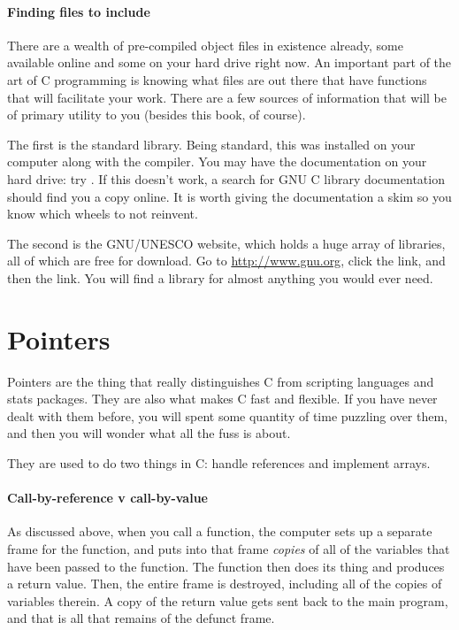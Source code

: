 \documentclass[12pt]{article}
\def\ind#1{\index{#1}#1}
\begin{document}
\paragraph{\treesymbol{} Finding files to include}    
There are a wealth of pre-compiled object files in existence already,
some available online and some on your hard drive right now.  An
important part of the art of C programming is knowing what files are
out there that have functions that will facilitate your work. There
are a few sources of information that will be of primary utility to you
(besides this book, of course).

The first is the standard library. Being standard, this was
installed on your computer along with the compiler. You may have the
documentation on your hard drive: try . If this doesn't
work, a search for GNU C library documentation should find you a copy
online. It is worth giving the documentation a skim so you know which
wheels to not reinvent.

The second is the GNU/UNESCO website, which holds a huge
array of libraries, all of which are free for download. Go to
\url{http://www.gnu.org}, click the  link, and then
the  link. You will find a library for almost
anything you would ever need.


 \label{prepointers}\section{Pointers} \label{pointers} 

Pointers are the thing that really distinguishes C from scripting
languages and stats packages. They are also what makes C fast and
flexible. If you have never dealt with them before, you will spent some
quantity of time puzzling over them, and then you will wonder what all the
fuss is about. 

They are used to do two things in C: handle references and implement arrays.

\paragraph{Call-by-reference v \ind{call-by-value}} 
  
As discussed above, when you call a function, the computer sets up a
separate frame for the function, and puts into that frame {\it copies} of
all of the variables that have been passed to the function. The function
then does its thing and produces a return value. Then, the entire frame
is destroyed, including all of the copies of variables therein. A copy
of the return value gets sent back to the main program, and that is all
that remains of the defunct frame.
\end{document}
